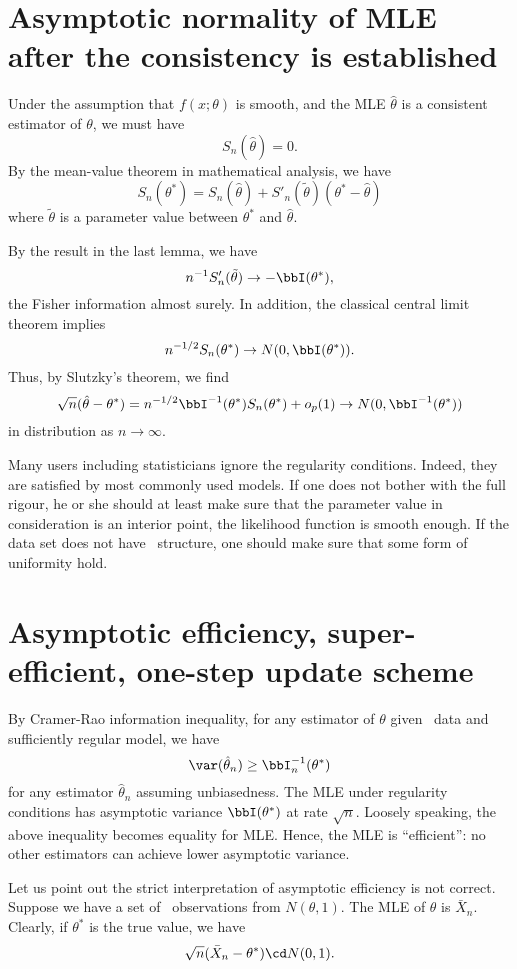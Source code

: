 \section{Asymptotic normality of MLE after the consistency is established}

Under the assumption that $f(x; \theta)$ is smooth, and
the MLE $\hat \theta$ is a consistent estimator of $\theta$, we must
have
\[
S_n(\hat \theta) = 0.
\]
By the mean-value theorem in mathematical analysis, we have
\[
S_n( \theta^* ) 
= 
S_n(\hat \theta) + S'_n(\tilde \theta) (\theta^* - \hat \theta)
\]
where $\tilde \theta$ is a parameter value between $\theta^*$
and $\hat \theta$.

By the result in the last lemma, we have 
\[
n^{-1} S'_n(\tilde \theta) \to - \bbI(\theta^*),
\]
the Fisher information almost surely.
In addition, the classical central limit theorem implies
\[
n^{-1/2} S_n( \theta^* ) \to N(0, \bbI(\theta^*)).
\]
Thus, by Slutzky's theorem, we find
\[
\sqrt{n} (\hat \theta - \theta^*) 
= n^{-1/2} \bbI^{-1}(\theta^*) S_n( \theta^* ) + o_p(1)
\to N(0, \bbI^{-1}(\theta^*))
\]
in distribution as $n \to \infty$.

Many users including statisticians ignore the regularity conditions.
Indeed, they are satisfied by most commonly used models. 
If one does not bother with the full rigour,
he or she should at least make sure that the parameter value in
consideration is an interior point, the likelihood function is smooth
enough. If the data set does not have \iid\ structure, one should
make sure that some form of uniformity hold.

\section{Asymptotic efficiency, super-efficient, one-step update scheme}

By Cramer-Rao information inequality, for any estimator of $\theta$
given \iid\ data and sufficiently regular model, we have
\[
\var(\hat \theta_n) \geq \bbI_n^{-1}(\theta^*)
\]
for any estimator $\hat \theta_n$
assuming unbiasedness. The MLE under regularity conditions has
asymptotic variance $\bbI(\theta^*)$ at rate $\sqrt{n}$. Loosely
speaking, the above inequality becomes equality for MLE.
Hence, the MLE is ``efficient'': no other estimators can achieve
lower asymptotic variance.

Let us point out the strict interpretation of asymptotic efficiency
is not correct. Suppose we have a set of \iid\ observations from
$N(\theta, 1)$. The MLE of $\theta$ is $\bar X_n$. 
Clearly, if $\theta^*$ is the true value, we have
\[
\sqrt{n}(\bar X_n - \theta^*) \cd N(0, 1).
\]

